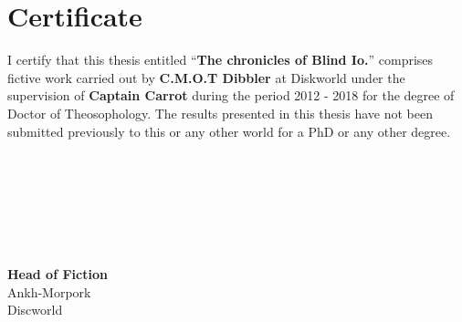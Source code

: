 \chapter[Certificate]{\centering Certificate}
I certify that this thesis entitled “\textbf{The chronicles of Blind Io.}” comprises fictive work carried out by \textbf{C.M.O.T Dibbler} at Diskworld under the supervision of \textbf{Captain Carrot} during the period 2012 - 2018 for the degree of Doctor of Theosophology. The results presented in this thesis have not been submitted previously to this or any other world for a PhD or any other degree.
\\\\\\\\\\\\\\\\
\null\hfill \textbf{Head of Fiction}\\
\null\hfill Ankh-Morpork\\
\null\hfill Discworld\\
